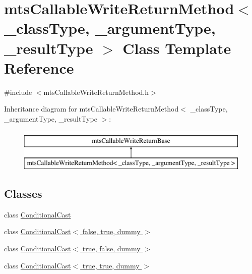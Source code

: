 \hypertarget{classmts_callable_write_return_method}{}\section{mts\+Callable\+Write\+Return\+Method$<$ \+\_\+class\+Type, \+\_\+argument\+Type, \+\_\+result\+Type $>$ Class Template Reference}
\label{classmts_callable_write_return_method}


{\ttfamily \#include $<$mts\+Callable\+Write\+Return\+Method.\+h$>$}

Inheritance diagram for mts\+Callable\+Write\+Return\+Method$<$ \+\_\+class\+Type, \+\_\+argument\+Type, \+\_\+result\+Type $>$\+:\begin{figure}[H]
\begin{center}
\leavevmode
\includegraphics[height=2.000000cm]{d8/d94/classmts_callable_write_return_method}
\end{center}
\end{figure}
\subsection*{Classes}
\begin{DoxyCompactItemize}
\item 
class \hyperlink{classmts_callable_write_return_method_1_1_conditional_cast}{Conditional\+Cast}
\item 
class \hyperlink{classmts_callable_write_return_method_1_1_conditional_cast_3_01false_00_01true_00_01dummy_01_4}{Conditional\+Cast$<$ false, true, dummy $>$}
\item 
class \hyperlink{classmts_callable_write_return_method_1_1_conditional_cast_3_01true_00_01false_00_01dummy_01_4}{Conditional\+Cast$<$ true, false, dummy $>$}
\item 
class \hyperlink{classmts_callable_write_return_method_1_1_conditional_cast_3_01true_00_01true_00_01dummy_01_4}{Conditional\+Cast$<$ true, true, dummy $>$}
\end{DoxyCompactItemize}

